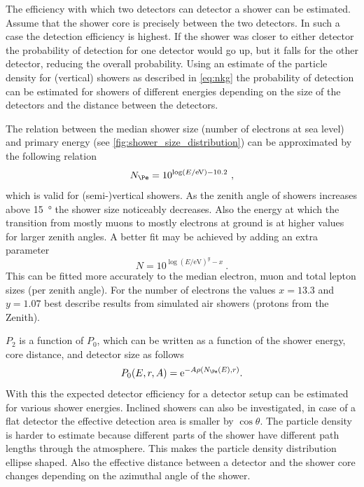 The efficiency with which two detectors can detector a shower can be estimated. Assume that the shower core is precisely between the two detectors. In such a case the detection efficiency is highest. If the shower was closer to either detector the probability of detection for one detector would go up, but it falls for the other detector, reducing the overall probability. Using an estimate of the particle density for (vertical) showers as described in \cref{eq:nkg} the probability of detection can be estimated for showers of different energies depending on the size of the detectors and the distance between the detectors.

The relation between the median shower size (number of electrons at sea level) and primary energy (see \cref{fig:shower_size_distribution}) can be approximated by the following relation
%
\begin{equation}
    N_{\Pe} = 10^{\log\left(E / {\si{\eV}}\right) - 10.2} \ ,
\end{equation}
%
which is valid for (semi-)vertical showers. As the zenith angle of showers increases above \SI{15}{\degree} the shower size noticeably decreases. Also the energy at which the transition from mostly muons to mostly electrons at ground is at higher values for larger zenith angles. A better fit may be achieved by adding an extra parameter
%
\begin{equation}
    N = 10^{\log\left(E / {\si{\eV}}\right)^y - x} \ .
\end{equation}
%
This can be fitted more accurately to the median electron, muon and total lepton sizes (per zenith angle). For the number of electrons the values $x = 13.3$ and $y = 1.07$ best describe results from simulated air showers (protons from the Zenith).

$P_2$ is a function of $P_0$, which can be written as a function of the shower energy, core distance, and detector size as follows
%
\begin{equation}
    P_0(E, r, A) = \mathrm{e}^{-A\rho(N_{\Pe}(E), r)} \\ .
\end{equation}
%
With this the expected detector efficiency for a detector setup can be estimated for various shower energies. Inclined showers can also be investigated, in case of a flat detector the effective detection area is smaller by $\cos \theta$. The particle density is harder to estimate because different parts of the shower have different path lengths through the atmosphere. This makes the particle density distribution ellipse shaped. Also the effective distance between a detector and the shower core changes depending on the azimuthal angle of the shower.

